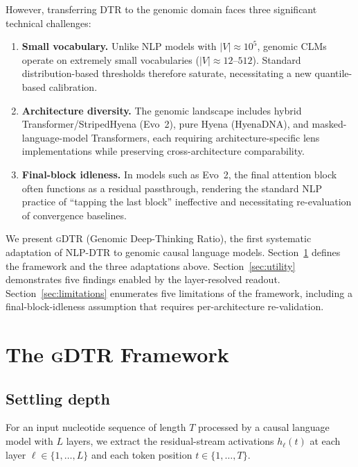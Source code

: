 \documentclass{article}
\theoremstyle{plain}
\theoremstyle{definition}
\theoremstyle{remark}
\newcommand{\gDTR}{\textsc{gDTR}}
\newcommand{\DTR}{\textsc{DTR}}
\newcommand{\hl}{h_{\ell}}
\begin{document}
However, transferring \DTR{} to the genomic domain faces three
significant technical challenges:
\begin{enumerate}
  \item \textbf{Small vocabulary.} Unlike NLP models with $|V|\approx
        10^5$, genomic CLMs operate on extremely small vocabularies
        ($|V|\approx 12$--$512$). Standard distribution-based thresholds
        therefore saturate, necessitating a new quantile-based
        calibration.
  \item \textbf{Architecture diversity.} The genomic landscape includes
        hybrid Transformer/StripedHyena (Evo~2), pure Hyena (HyenaDNA),
        and masked-language-model Transformers, each requiring
        architecture-specific lens implementations while preserving
        cross-architecture comparability.
  \item \textbf{Final-block idleness.} In models such as Evo~2, the
        final attention block often functions as a residual passthrough,
        rendering the standard NLP practice of ``tapping the last
        block'' ineffective and necessitating re-evaluation of
        convergence baselines.
\end{enumerate}

We present \gDTR{} (Genomic Deep-Thinking Ratio), the first systematic
adaptation of NLP-\DTR{} to genomic causal language models.
Section~\ref{sec:framework} defines the framework and the three
adaptations above. Section~\ref{sec:utility} demonstrates five findings
enabled by the layer-resolved readout. Section~\ref{sec:limitations}
enumerates five limitations of the framework, including a
final-block-idleness assumption that requires per-architecture
re-validation.

\section{The \gDTR{} Framework}
\label{sec:framework}

\subsection{Settling depth}
\label{sec:settling}

For an input nucleotide sequence of length $T$ processed by a causal
language model with $L$ layers, we extract the residual-stream
activations $\hl(t)$ at each layer
$\ell\in\{1,\dots,L\}$ and each token position $t\in\{1,\dots,T\}$.
\end{document}
